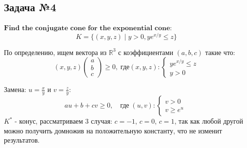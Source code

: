 \documentclass[12pt,letterpaper]{article}
\begin{document}
\newpage



\subsection*{Задача №4}
$\textbf{Find the conjugate cone for the exponential cone:}$
$$
K = \{(x, y, z) \mid y > 0, y e^{x/y} \leq z\}
$$

По определению, ищем вектора из $ \mathbb{R}^3 $ с коэффициентами $ (a, b, c) $ такие что: 
$$
(x, y, z)\left(\begin{array}{l}
a \\
b \\
c
\end{array}\right) \geq 0, \; \text{где}(x, y, z):\left\{\begin{array}{l}
y e^{x / y} \leq z \\
y>0
\end{array}\right.
$$

Замена: $ u = \frac{x}{y} $ и $ v = \frac{z}{y} $:
$$a u+b+c v \geq 0, \quad \text{где} \; (u, v): \left\{\begin{array}{l}
v>0 \\
v \geq e^{u}  \; 
\end{array}\right. $$ 
$ K^* $ - конус, рассматриваем 3 случая: $ c = -1 $, $ c = 0 $, $ c = 1 $, так как любой другой можно получить домножив на положительную константу, что не изменит результатов.
\end{document}
